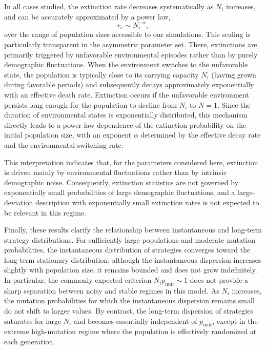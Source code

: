 \documentclass[a4paper,10pt,twocolumn]{article}
\begin{document}
In all cases studied, the extinction rate decreases systematically as $N_i$ increases, and can be accurately approximated by a power law,
\begin{equation}
    r_e \sim N_i^{-\alpha},
\end{equation}
over the range of population sizes accessible to our simulations. This scaling is particularly transparent in the asymmetric parameter set. There, extinctions are primarily triggered by unfavorable environmental episodes rather than by purely demographic fluctuations. When the environment switches to the unfavorable state, the population is typically close to its carrying capacity $N_i$ (having grown during favorable periods) and subsequently decays approximately exponentially with an effective death rate. Extinction occurs if the unfavorable environment persists long enough for the population to decline from $N_i$ to $N=1$. Since the duration of environmental states is exponentially distributed, this mechanism directly leads to a power-law dependence of the extinction probability on the initial population size, with an exponent $\alpha$ determined by the effective decay rate and the environmental switching rate.

This interpretation indicates that, for the parameters considered here, extinction is driven mainly by environmental fluctuations rather than by intrinsic demographic noise. Consequently, extinction statistics are not governed by exponentially small probabilities of large demographic fluctuations, and a large-deviation description with exponentially small extinction rates is not expected to be relevant in this regime.

Finally, these results clarify the relationship between instantaneous and long-term strategy distributions. For sufficiently large populations and moderate mutation probabilities, the instantaneous distribution of strategies converges toward the long-term stationary distribution: although the instantaneous dispersion increases slightly with population size, it remains bounded and does not grow indefinitely. In particular, the commonly expected criterion $N_i p_{\text{mut}}\sim 1$ does not provide a sharp separation between noisy and stable regimes in this model. As $N_i$ increases, the mutation probabilities for which the instantaneous dispersion remains small do not shift to larger values. By contrast, the long-term dispersion of strategies saturates for large $N_i$ and becomes essentially independent of $p_{\text{mut}}$, except in the extreme high-mutation regime where the population is effectively randomized at each generation.
\end{document}
